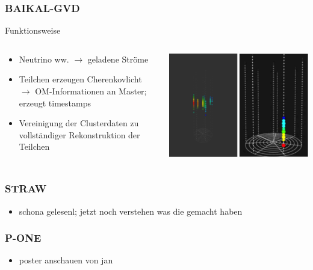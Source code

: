 \documentclass[aspectratio=1610, 9pt]{beamer}
\begin{document}
\begin{frame}\frametitle{BAIKAL-GVD}
  \begin{block}{Funktionsweise}
    \begin{columns}
    \begin{column}[c]{0.45\textwidth}
      \begin{itemize}
        \item Neutrino ww. $\to$ geladene Str\"ome
        \item Teilchen erzeugen Cherenkovlicht $\to$ OM-Informationen an Master; erzeugt timestamps
        \item Vereinigung der Clusterdaten zu vollst\"andiger Rekonstruktion der Teilchen
      \end{itemize}
    \end{column}
    \begin{column}[c]{0.45\textwidth}
      \includegraphics{images/baikal2.png}
    \end{column}
    \end{columns}
  \end{block}
\end{frame}


\begin{frame}\frametitle{STRAW}
  \begin{itemize}
    \item schona gelesenl; jetzt noch verstehen was die gemacht haben
  \end{itemize}
\end{frame}

\begin{frame}\frametitle{P-ONE}
  \begin{itemize}
    \item poster anschauen von jan
  \end{itemize}
\end{frame}
\end{document}
